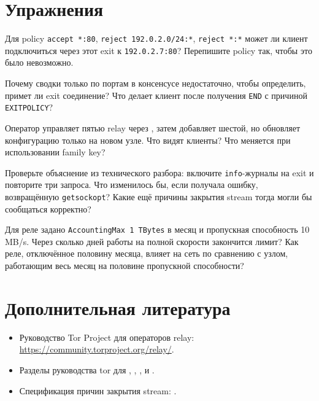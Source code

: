 \section*{Упражнения}

\begin{esercizio}[1]\label{es:22-ordine}
Для policy \texttt{accept *:80}, \texttt{reject 192.0.2.0/24:*}, \texttt{reject *:*} может ли клиент подключиться через этот exit к \texttt{192.0.2.7:80}? Перепишите policy так, чтобы это было невозможно.
\end{esercizio}

\begin{esercizio}[1]\label{es:22-riassunto}
Почему сводки только по портам в консенсусе недостаточно, чтобы определить, примет ли exit соединение? Что делает клиент после получения \texttt{END} с причиной \texttt{EXITPOLICY}?
\end{esercizio}

\begin{esercizio}[2]\label{es:22-famiglia}
Оператор управляет пятью relay через , затем добавляет шестой, но обновляет конфигурацию только на новом узле. Что видят клиенты? Что меняется при использовании family key?
\end{esercizio}

\begin{esercizio}[2]\label{es:22-refused}
Проверьте объяснение из технического разбора: включите \texttt{info}-журналы на exit и повторите три запроса. Что изменилось бы, если  получала ошибку, возвращённую \texttt{getsockopt}? Какие ещё причины закрытия stream тогда могли бы сообщаться корректно?
\end{esercizio}

\begin{esercizio}[3]\label{es:22-accounting}
Для реле задано \texttt{AccountingMax 1 TBytes} в месяц и пропускная способность 10\,MB/s. Через сколько дней работы на полной скорости закончится лимит? Как реле, отключённое половину месяца, влияет на сеть по сравнению с узлом, работающим весь месяц на половине пропускной способности?
\end{esercizio}

\section*{Дополнительная литература}
\begin{itemize}
  \item Руководство Tor Project для операторов relay: \url{https://community.torproject.org/relay/}.
  \item \begin{sloppypar}Разделы руководства tor для , ,
        ,  и .\end{sloppypar}
  \item Спецификация причин закрытия stream: .
\end{itemize}
